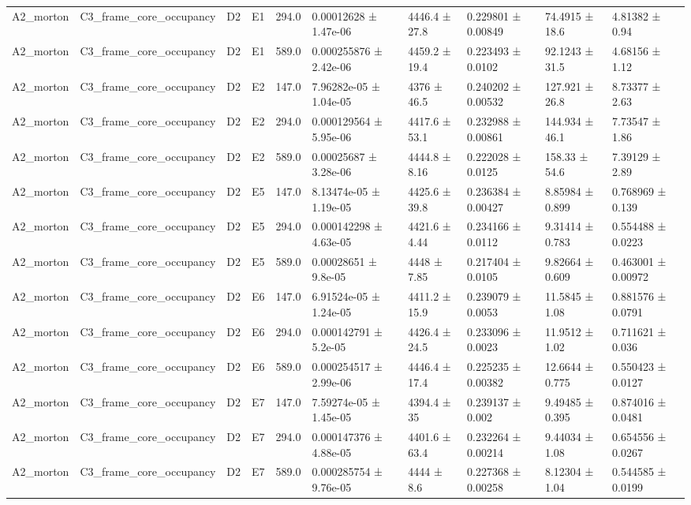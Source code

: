 \begin{table}
\begin{tabular}{llllllllll}
A2\_morton & C3\_frame\_core\_occupancy & D2 & E1 & 294.0 & 0.00012628 ± 1.47e-06 & 4446.4 ± 27.8 & 0.229801 ± 0.00849 & 74.4915 ± 18.6 & 4.81382 ± 0.94 \\
A2\_morton & C3\_frame\_core\_occupancy & D2 & E1 & 589.0 & 0.000255876 ± 2.42e-06 & 4459.2 ± 19.4 & 0.223493 ± 0.0102 & 92.1243 ± 31.5 & 4.68156 ± 1.12 \\
A2\_morton & C3\_frame\_core\_occupancy & D2 & E2 & 147.0 & 7.96282e-05 ± 1.04e-05 & 4376 ± 46.5 & 0.240202 ± 0.00532 & 127.921 ± 26.8 & 8.73377 ± 2.63 \\
A2\_morton & C3\_frame\_core\_occupancy & D2 & E2 & 294.0 & 0.000129564 ± 5.95e-06 & 4417.6 ± 53.1 & 0.232988 ± 0.00861 & 144.934 ± 46.1 & 7.73547 ± 1.86 \\
A2\_morton & C3\_frame\_core\_occupancy & D2 & E2 & 589.0 & 0.00025687 ± 3.28e-06 & 4444.8 ± 8.16 & 0.222028 ± 0.0125 & 158.33 ± 54.6 & 7.39129 ± 2.89 \\
A2\_morton & C3\_frame\_core\_occupancy & D2 & E5 & 147.0 & 8.13474e-05 ± 1.19e-05 & 4425.6 ± 39.8 & 0.236384 ± 0.00427 & 8.85984 ± 0.899 & 0.768969 ± 0.139 \\
A2\_morton & C3\_frame\_core\_occupancy & D2 & E5 & 294.0 & 0.000142298 ± 4.63e-05 & 4421.6 ± 4.44 & 0.234166 ± 0.0112 & 9.31414 ± 0.783 & 0.554488 ± 0.0223 \\
A2\_morton & C3\_frame\_core\_occupancy & D2 & E5 & 589.0 & 0.00028651 ± 9.8e-05 & 4448 ± 7.85 & 0.217404 ± 0.0105 & 9.82664 ± 0.609 & 0.463001 ± 0.00972 \\
A2\_morton & C3\_frame\_core\_occupancy & D2 & E6 & 147.0 & 6.91524e-05 ± 1.24e-05 & 4411.2 ± 15.9 & 0.239079 ± 0.0053 & 11.5845 ± 1.08 & 0.881576 ± 0.0791 \\
A2\_morton & C3\_frame\_core\_occupancy & D2 & E6 & 294.0 & 0.000142791 ± 5.2e-05 & 4426.4 ± 24.5 & 0.233096 ± 0.0023 & 11.9512 ± 1.02 & 0.711621 ± 0.036 \\
A2\_morton & C3\_frame\_core\_occupancy & D2 & E6 & 589.0 & 0.000254517 ± 2.99e-06 & 4446.4 ± 17.4 & 0.225235 ± 0.00382 & 12.6644 ± 0.775 & 0.550423 ± 0.0127 \\
A2\_morton & C3\_frame\_core\_occupancy & D2 & E7 & 147.0 & 7.59274e-05 ± 1.45e-05 & 4394.4 ± 35 & 0.239137 ± 0.002 & 9.49485 ± 0.395 & 0.874016 ± 0.0481 \\
A2\_morton & C3\_frame\_core\_occupancy & D2 & E7 & 294.0 & 0.000147376 ± 4.88e-05 & 4401.6 ± 63.4 & 0.232264 ± 0.00214 & 9.44034 ± 1.08 & 0.654556 ± 0.0267 \\
A2\_morton & C3\_frame\_core\_occupancy & D2 & E7 & 589.0 & 0.000285754 ± 9.76e-05 & 4444 ± 8.6 & 0.227368 ± 0.00258 & 8.12304 ± 1.04 & 0.544585 ± 0.0199 \\

\end{tabular}
\end{table}
